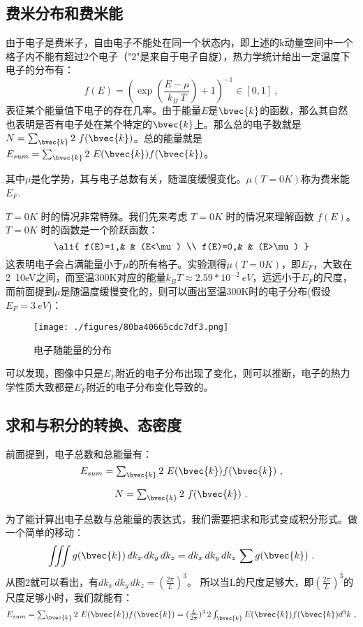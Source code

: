 \subsection{费米分布和费米能}
由于电子是费米子，自由电子不能处在同一个状态内，即上述的k动量空间中一个格子内不能有超过2个电子（"2"是来自于电子自旋），热力学统计给出一定温度下电子的分布有：
\begin{equation}
f(E)=\left (\exp(\frac{E-\mu}{k_B\ T})+1\right )^{-1}    \in[0,1]~,
\end{equation}
表征某个能量值下电子的存在几率。由于能量$E$是$\bvec{k}$的函数，那么其自然也表明是否有电子处在某个特定的$\bvec{k}$上。那么总的电子数就是$N=\textstyle \sum_{\bvec{k}}2\ f(\bvec{k})$。总的能量就是$E_{sum}=\textstyle \sum_{\bvec{k}}2\ E(\bvec{k})f(\bvec{k})$。

其中$\mu$是化学势，其与电子总数有关，随温度缓慢变化。$\mu (T=0K)$称为费米能$E_F$.

$T=0K$ 时的情况非常特殊。我们先来考虑 $T=0K$ 时的情况来理解函数 $f(E)$。$T=0K$ 时的函数是一个阶跃函数：
\begin{equation}\ali{
f(E)=1,& & (E<\mu) \\
f(E)=0,& & (E>\mu)
}\end{equation}
这表明电子会占满能量小于$\mu$的所有格子。实验测得$\mu(T=0K)$，即$E_F$，大致在2~10eV之间，而室温300K对应的能量$k_BT\approx2.59*10^{-2}\ eV$，远远小于$E_F$的尺度，而前面提到$\mu$是随温度缓慢变化的，则可以画出室温300K时的电子分布(假设$E_F=3\ eV$)：
\begin{figure}[ht]
\centering
\texttt{[image: ./figures/80ba40665cdc7df3.png]}
\caption{电子随能量的分布} \label{fig_SMFM_3}
\end{figure}
可以发现，图像中只是$E_F$附近的电子分布出现了变化，则可以推断，电子的热力学性质大致都是$E_F$附近的电子分布变化导致的。

\subsection{求和与积分的转换、态密度}
前面提到，电子总数和总能量有：
\begin{equation}
E_{sum}=\textstyle \sum_{\bvec{k}}2\ E(\bvec{k})f(\bvec{k})~,
\end{equation}

\begin{equation}
N=\textstyle \sum_{\bvec{k}}2\ f(\bvec{k})~.
\end{equation}

为了能计算出电子总数与总能量的表达式，我们需要把求和形式变成积分形式。做一个简单的移动：
\begin{equation}
\iiint g(\bvec{k})\,dk_x\,dk_y\,dk_z=dk_x\,dk_y\,dk_z\,\sum g(\bvec{k})~.
\end{equation}
从图2就可以看出，有$dk_x\,dk_y\,dk_z=(\frac{2\pi}{L})^3$。
所以当L的尺度足够大，即$(\frac{2\pi}{L})^3$的尺度足够小时，我们就能有：
\begin{equation}
E_{sum}=\textstyle \sum_{\bvec{k}}2\ E(\bvec{k})f(\bvec{k})=(\frac{L}{2\pi})^3\,2 \int_{\bvec{k}}E(\bvec{k})f(\bvec{k})d^3k~,
\end{equation}

